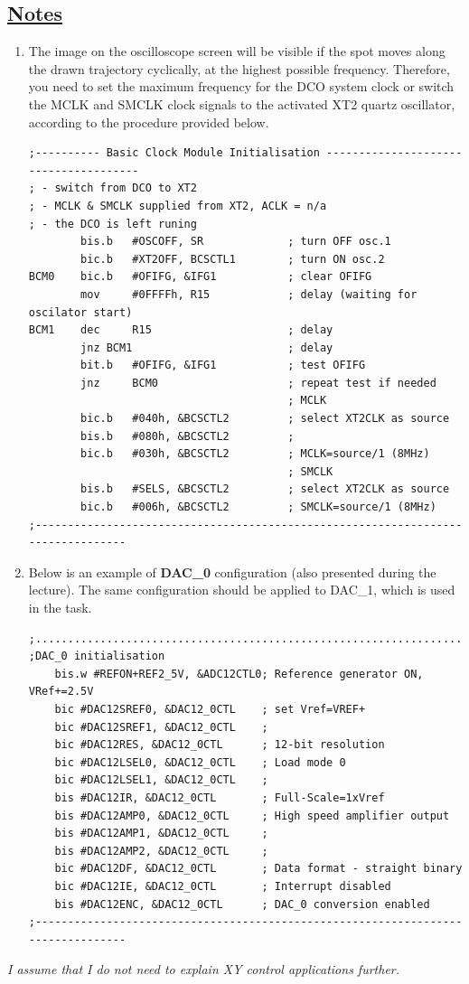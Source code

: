 \documentclass{article}
\begin{document}
\newpage
\subsection*{\underline{Notes}}
\begin{enumerate}
    \item The image on the oscilloscope screen will be visible if the spot moves along the drawn trajectory cyclically, at the highest possible frequency. Therefore, you need to set the maximum frequency for the DCO system clock or switch the MCLK and SMCLK clock signals to the activated XT2 quartz oscillator, according to the procedure provided below.
\begin{verbatim}
;---------- Basic Clock Module Initialisation --------------------------------------
; - switch from DCO to XT2
; - MCLK & SMCLK supplied from XT2, ACLK = n/a
; - the DCO is left runing
        bis.b   #OSCOFF, SR             ; turn OFF osc.1
        bic.b   #XT2OFF, BCSCTL1        ; turn ON osc.2
BCM0    bic.b   #OFIFG, &IFG1           ; clear OFIFG
        mov     #0FFFFh, R15            ; delay (waiting for oscilator start)
BCM1    dec     R15                     ; delay
        jnz BCM1                        ; delay
        bit.b   #OFIFG, &IFG1           ; test OFIFG
        jnz     BCM0                    ; repeat test if needed
                                        ; MCLK
        bic.b   #040h, &BCSCTL2         ; select XT2CLK as source
        bis.b   #080h, &BCSCTL2         ;
        bic.b   #030h, &BCSCTL2         ; MCLK=source/1 (8MHz)
                                        ; SMCLK
        bis.b   #SELS, &BCSCTL2         ; select XT2CLK as source
        bic.b   #006h, &BCSCTL2         ; SMCLK=source/1 (8MHz)
;---------------------------------------------------------------------------------
\end{verbatim}
    \item Below is an example of \textbf{DAC\_0} configuration (also presented during the lecture). The same configuration should be applied to DAC\_1, which is used in the task.
\begin{verbatim}
;.................................................................. ;DAC_0 initialisation
    bis.w #REFON+REF2_5V, &ADC12CTL0; Reference generator ON, VRef+=2.5V
    bic #DAC12SREF0, &DAC12_0CTL    ; set Vref=VREF+
    bic #DAC12SREF1, &DAC12_0CTL    ;
    bic #DAC12RES, &DAC12_0CTL      ; 12-bit resolution
    bic #DAC12LSEL0, &DAC12_0CTL    ; Load mode 0
    bic #DAC12LSEL1, &DAC12_0CTL    ;
    bis #DAC12IR, &DAC12_0CTL       ; Full-Scale=1xVref
    bis #DAC12AMP0, &DAC12_0CTL     ; High speed amplifier output 
    bis #DAC12AMP1, &DAC12_0CTL     ;
    bis #DAC12AMP2, &DAC12_0CTL     ;
    bic #DAC12DF, &DAC12_0CTL       ; Data format - straight binary 
    bic #DAC12IE, &DAC12_0CTL       ; Interrupt disabled 
    bis #DAC12ENC, &DAC12_0CTL      ; DAC_0 conversion enabled 
;---------------------------------------------------------------------------------
\end{verbatim}
\end{enumerate}

\textit{I assume that I do not need to explain XY control applications further.}
\end{document}
